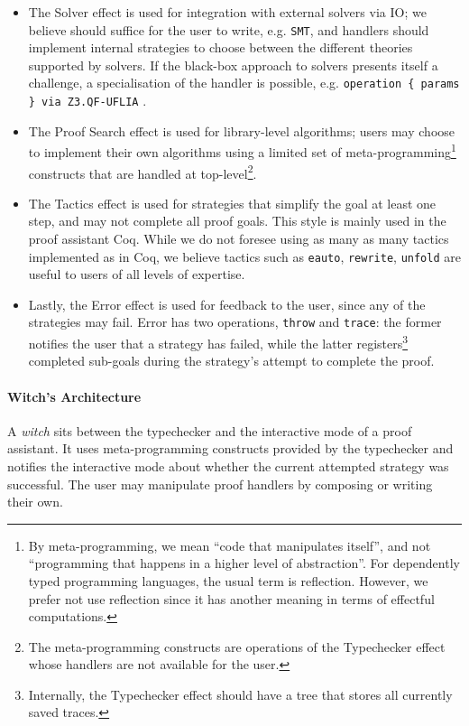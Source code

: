 \documentclass[sigconfl]{acmart}
\begin{document}
\begin{itemize}
  \item The Solver effect is used for integration with external solvers via IO;
    we believe should suffice for the user to write, e.g. \texttt{SMT}, and handlers should
    implement internal strategies to choose between the different theories
    supported by solvers. If the black-box approach to solvers presents itself a
    challenge, a specialisation of the handler is possible, e.g.
    \texttt{operation \{ params \} via Z3.QF-UFLIA} \cite{Z32008}.
  \item The Proof Search effect is used for library-level algorithms; users may
    choose to implement their own algorithms using a limited set of
    meta-programming\footnote{By meta-programming, we mean ``code that manipulates
    itself'', and not ``programming that happens in a higher level of abstraction''.
    For dependently typed programming languages, the usual term is reflection.
    However, we prefer not use reflection since it has another meaning in
    terms of effectful computations.} constructs that are handled at top-level\footnote{The
      meta-programming constructs are operations of the Typechecker effect
      whose handlers are not available for the user.}.
  \item The Tactics effect is used for strategies that simplify the goal at
    least one step, and may not complete all proof goals. This style is mainly
    used in the proof assistant Coq. While we do not foresee using as many as many
    tactics implemented as in Coq, we believe tactics such as
    \texttt{eauto}, \texttt{rewrite}, \texttt{unfold} are useful to users of
    all levels of expertise.
    \item Lastly, the Error effect is used for feedback to the user,
    since any of the strategies may fail. Error has two operations,
    \texttt{throw} and \texttt{trace}: the former notifies the user that a strategy
    has failed, while the latter registers\footnote{Internally, the
      Typechecker effect should have a tree that stores all currently
      saved traces.} completed sub-goals during the
    strategy's attempt to complete the proof.
\end{itemize}

\paragraph{Witch's Architecture}
A \textit{witch} sits between the typechecker and the interactive mode of a
proof assistant. It uses meta-programming constructs provided by the typechecker and notifies
the interactive mode about whether the current attempted strategy was successful.
The user may manipulate proof handlers by composing or writing their own.
\end{document}
